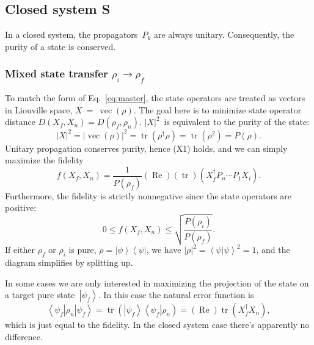 \documentclass[aps, pra, a4paper, longbibliography]{revtex4}
\newcommand{\be}{\begin{equation}}
\newcommand{\ee}{\end{equation}}
\newcommand{\ket}[1]{\left| #1 \right \rangle}
\newcommand{\bra}[1]{\left \langle #1 \right|}
\newcommand{\braket}[2]{\left \langle #1 | #2 \right \rangle}
\newcommand{\ketbra}[2]{\left| #1 \right \rangle \left \langle #2 \right|}
\DeclareMathOperator{\tr}{tr}
\DeclareMathOperator{\re}{Re}
\DeclareMathOperator{\cvec}{vec}
\newcommand{\dd}[2]{\frac{\partial #1}{\partial #2}}
\begin{document}



\subsection{Closed system S}

In a closed system, the propagators~$P_k$ are always
unitary. Consequently, the purity of a state is conserved.


\subsubsection{Mixed state transfer $\rho_i \to \rho_f$}
\label{sec:closed-mixed}

To match the form of Eq.~\eqref{eq:master},
the state operators are treated as vectors in Liouville space, $X~=~\cvec(\rho)$.
The goal here is to minimize state operator distance
$D(X_f, X_n) = D(\rho_f, \rho_n)$.
$|X|^2$~is equivalent to the purity of the state:
\be
|X|^2
= |\cvec(\rho)|^2
= \tr(\rho^\dagger \rho)
= \tr(\rho^2)
= P(\rho).
\ee
Unitary propagation conserves purity, hence (X1) holds, and we can
simply maximize the fidelity
\be
f(X_f, X_n)
= \frac{1}{P(\rho_f)} (\re) (\tr) \left( X_f^\dagger  P_n \cdots P_1 X_i \right).
\ee
Furthermore, the fidelity is strictly nonnegative since the
state operators are positive:
\be
0 \le f(X_f, X_n) \le \sqrt{\frac{P(\rho_i)}{P(\rho_f)}}.
\ee
If either $\rho_f$ or $\rho_i$ is pure,
$\rho = \ketbra{\psi}{\psi}$,
we have $|\rho|^2 = \braket{\psi}{\psi}^2 = 1$, and
the diagram simplifies by splitting up.


In some cases we are only interested in maximizing the projection of
the state on a target pure state~$\ket{\psi_f}$. In this case the natural error
function is
\be
\bra{\psi_f} \rho_n \ket{\psi_f}
= \tr\left(\ketbra{\psi_f}{\psi_f} \rho_n \right)
= (\re) \tr\left(X_f^\dagger X_n\right),
\ee
which is just equal to the fidelity. In the closed system case there's
apparently no difference.
\end{document}
